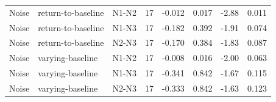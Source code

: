 \begin{tabular}{lllrrrrr}
Noise & return-to-baseline & N1-N2 & 17 & -0.012 & 0.017 & -2.88 & 0.011 \\
Noise & return-to-baseline & N1-N3 & 17 & -0.182 & 0.392 & -1.91 & 0.074 \\
Noise & return-to-baseline & N2-N3 & 17 & -0.170 & 0.384 & -1.83 & 0.087 \\
Noise & varying-baseline & N1-N2 & 17 & -0.008 & 0.016 & -2.00 & 0.063 \\
Noise & varying-baseline & N1-N3 & 17 & -0.341 & 0.842 & -1.67 & 0.115 \\
Noise & varying-baseline & N2-N3 & 17 & -0.333 & 0.842 & -1.63 & 0.123 \\
\bottomrule
\end{tabular}

